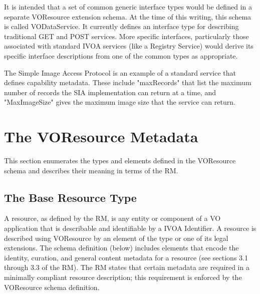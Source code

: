 \documentclass[11pt,a4paper]{ivoa}
\begin{document}
\begin{admonition}[Note]
It is intended that a set of common generic interface types
would be defined in a separate VOResource extension schema.
At the time of this writing, this schema is called
VODataService.  It currently defines an interface type for
describing traditional GET and POST services.  More specific
interfaces, particularly those associated with standard IVOA
services (like a Registry Service) would derive its specific
interface descriptions from one of the common types as
appropriate.
\end{admonition}


\begin{admonition}[Note]
The Simple Image Access Protocol \citep{2009ivoa.spec.1111H} is an
example of a standard service that defines capability
metadata.  These include "maxRecords" that list the maximum
number of records the SIA implementation can return at a time,
and "MaxImageSize" gives the maximum image size that the
service can return.
\end{admonition}



\section{The VOResource Metadata}
\label{sect:metadata}


This section enumerates the types and elements defined in the
VOResource schema and describes their meaning in terms of the
RM.


\subsection{The Base Resource Type}

\label{sect:restype}

A resource, as defined by the RM, is any entity or component of a VO
application that is describable and identifiable by a IVOA Identifier.
A resource is described using VOResource by an element of the type
 or one of its legal extensions.  The schema
definition (below) includes elements that encode the identity, curation,
and general content metadata for a resource (see sections 3.1 through
3.3 of the RM).  The RM states that certain metadata are required in a
minimally compliant resource description; this requirement is enforced
by the VOResource schema definition.  

\end{document}
